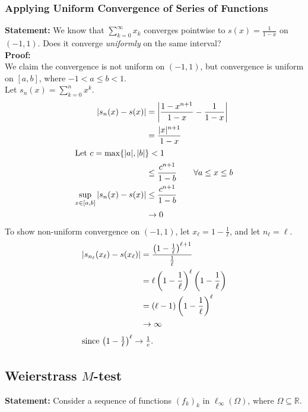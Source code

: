 \documentclass[10pt]{extarticle}
\newcommand{\R}{\mathbb{R}}
\begin{document}
    \subsubsection{Applying Uniform Convergence of Series of Functions}%
    \textbf{Statement:} We know that $\sum_{k=0}^{\infty} x_k$ converges pointwise to $s(x) = \frac{1}{1-x}$ on $(-1,1)$. Does it converge \textit{uniformly} on the same interval?\\

    \textbf{Proof:}\\
    We claim the convergence is not uniform on $(-1,1)$, but convergence is uniform on $[a,b]$, where $-1 < a \leq b < 1 $.\\

    Let $s_n(x) = \sum_{k=0}^{n}x^k$.
    \begin{align*}
      |s_n(x) - s(x)| &= \left\vert\frac{1-x^{n+1}}{1-x} - \frac{1}{1-x}\right\vert\\
                      &= \frac{|x|^{n+1}}{1-x}\\
      \shortintertext{Let $c = \max\{|a|,|b|\} < 1$}
                      &\leq \frac{c^{n+1}}{1-b}\tag*{$\forall a \leq x \leq b$}\\
      \sup_{x\in[a,b]}|s_n(x) - s(x)| &\leq \frac{c^{n+1}}{1-b}\\
                                      &\rightarrow 0
    \end{align*}
    To show non-uniform convergence on $(-1,1)$, let $x_{\ell} = 1 - \frac{1}{\ell}$, and let $n_{\ell} = \ell$.
    \begin{align*}
      \left|s_{n_{\ell}}(x_{\ell}) - s(x_{\ell})\right| &= \frac{\left(1-\frac{1}{\ell}\right)^{\ell+1}}{\frac{1}{\ell}}\\
                                                        &= \ell\left(1-\frac{1}{\ell}\right)^{\ell}\left(1-\frac{1}{\ell}\right)\\
                                                        &= (\ell - 1)\left(1-\frac{1}{\ell}\right)^{\ell}\\
                                                        &\rightarrow \infty\\
      \shortintertext{since $\left(1-\frac{1}{\ell}\right)^{\ell}\rightarrow \frac{1}{e}$.}
    \end{align*}
  \subsection{Weierstrass $M$-test}%
    \textbf{Statement:} Consider a sequence of functions $(f_k)_k$ in $\ell_{\infty}(\Omega)$, where $\Omega \subseteq \R$.\\
\end{document}

